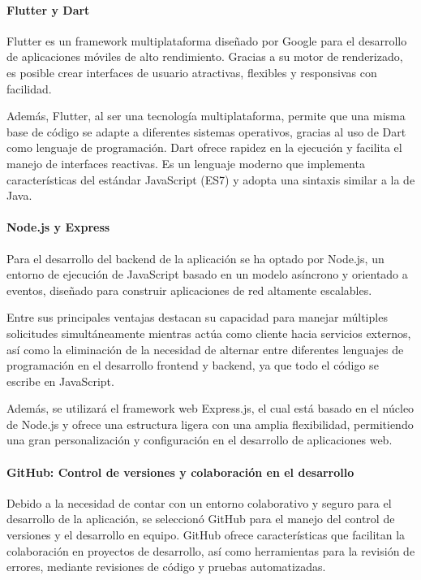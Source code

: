 \documentclass[spanish]{ieee_upb}
\begin{document}
\paragraph{\textbf{Flutter y Dart}}
Flutter es un framework multiplataforma diseñado por Google para el desarrollo de aplicaciones móviles de alto rendimiento. Gracias a su motor de renderizado, es posible crear interfaces de usuario atractivas, flexibles y responsivas con facilidad. \cite{tashildar2020application} \cite{Kinari2024}
\vspace{0.3 cm}

Además, Flutter, al ser una tecnología multiplataforma, permite que una misma base de código se adapte a diferentes sistemas operativos, gracias al uso de Dart como lenguaje de programación. Dart ofrece rapidez en la ejecución y facilita el manejo de interfaces reactivas. Es un lenguaje moderno que implementa características del estándar JavaScript (ES7) y adopta una sintaxis similar a la de Java.\cite{tashildar2020application}
\vspace{0.3 cm}

\paragraph{\textbf{Node.js y Express}}
Para el desarrollo del backend de la aplicación se ha optado por Node.js, un entorno de ejecución de JavaScript basado en un modelo asíncrono y orientado a eventos, diseñado para construir aplicaciones de red altamente escalables. \cite{shah2017node} \cite{haro2019desarrollo}
\vspace{0.3 cm}

Entre sus principales ventajas destacan su capacidad para manejar múltiples solicitudes simultáneamente mientras actúa como cliente hacia servicios externos, así como la eliminación de la necesidad de alternar entre diferentes lenguajes de programación en el desarrollo frontend y backend, ya que todo el código se escribe en JavaScript. \cite{shah2017node} \cite{haro2019desarrollo}
\vspace{0.3 cm}

Además, se utilizará el framework web Express.js, el cual está basado en el núcleo de Node.js y ofrece una estructura ligera con una amplia flexibilidad, permitiendo una gran personalización y configuración en el desarrollo de aplicaciones web. \cite{mardan2018using}
\vspace{0.3 cm}


\paragraph{\textbf{GitHub: Control de versiones y colaboración en el desarrollo}
}
Debido a la necesidad de contar con un entorno colaborativo y seguro para el desarrollo de la aplicación, se seleccionó GitHub para el manejo del control de versiones y el desarrollo en equipo. GitHub ofrece características que facilitan la colaboración en proyectos de desarrollo, así como herramientas para la revisión de errores, mediante revisiones de código y pruebas automatizadas. \cite{cosentino2017systematic}
\end{document}
